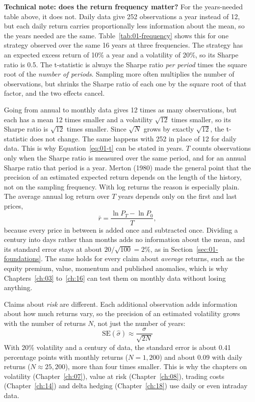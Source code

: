 \begin{technote}
\textbf{Technical note: does the return frequency matter?} For the years-needed table above, it does not. Daily data give 252 observations a year instead of 12, but each daily return carries proportionally less information about the mean, so the years needed are the same. Table~\ref{tab:01-frequency} shows this for one strategy observed over the same 16 years at three frequencies. The strategy has an expected excess return of 10\% a year and a volatility of 20\%, so its Sharpe ratio is 0.5. The t-statistic is always the Sharpe ratio \emph{per period} times the square root of the \emph{number of periods}. Sampling more often multiplies the number of observations, but shrinks the Sharpe ratio of each one by the square root of that factor, and the two effects cancel.


Going from annual to monthly data gives 12 times as many observations, but each has a mean 12 times smaller and a volatility $\sqrt{12}$ times smaller, so its Sharpe ratio is $\sqrt{12}$ times smaller. Since $\sqrt{N}$ grows by exactly $\sqrt{12}$, the t-statistic does not change. The same happens with 252 in place of 12 for daily data. This is why Equation~\eqref{eq:01-t} can be stated in years. $T$ counts observations only when the Sharpe ratio is measured over the same period, and for an annual Sharpe ratio that period is a year. Merton (1980) made the general point that the precision of an estimated expected return depends on the length of the history, not on the sampling frequency. With log returns the reason is especially plain. The average annual log return over $T$ years depends only on the first and last prices,
\begin{equation}
  \bar{r} = \frac{\ln P_T - \ln P_0}{T}, \nonumber
\end{equation}
because every price in between is added once and subtracted once. Dividing a century into days rather than months adds no information about the mean, and its standard error stays at about $20/\sqrt{100} = 2$\%, as in Section~\ref{sec:01-foundations}. The same holds for every claim about \emph{average} returns, such as the equity premium, value, momentum and published anomalies, which is why Chapters~\ref{ch:03} to~\ref{ch:16} can test them on monthly data without losing anything.

Claims about \emph{risk} are different. Each additional observation adds information about how much returns vary, so the precision of an estimated volatility grows with the number of returns $N$, not just the number of years:
\begin{equation}
  \mathrm{SE}(\hat{\sigma}) \approx \frac{\sigma}{\sqrt{2N}} \nonumber
\end{equation}
With 20\% volatility and a century of data, the standard error is about 0.41 percentage points with monthly returns ($N = 1{,}200$) and about 0.09 with daily returns ($N \approx 25{,}200$), more than four times smaller. This is why the chapters on volatility (Chapter~\ref{ch:07}), value at risk (Chapter~\ref{ch:08}), trading costs (Chapter~\ref{ch:14}) and delta hedging (Chapter~\ref{ch:18}) use daily or even intraday data.


\end{technote}
